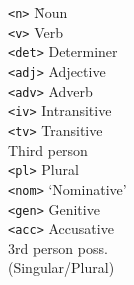 \documentclass[a0paper,fontscale=0.3]{baposter}  %
\begin{document}
\begin{poster}
{\vspace{-1.5em}
\setlength{\columnsep}{-1em}
\setlength{\topsep}{-\parskip}
\begin{multicols}{3}
\begin{tabbing}
  \texttt{{\small <n>}}\hspace{3.1em} \=  Noun\\[-0.5ex]
  \texttt{{\small <v>}} \>  Verb\\[-0.5ex]
  \texttt{{\small <det>}} \>  Determiner\\[-0.5ex]
  \texttt{{\small <adj>}} \> Adjective\\[-0.5ex]
  \texttt{{\small <adv>}} \> Adverb\\[-0.5ex]
  \texttt{{\small <iv>}} \> Intransitive\\[-0.5ex]
  \texttt{{\small <tv>}} \> Transitive\\[-0.5ex]
  \texttt{{}} \> Third person\\[-0.5ex]
  \texttt{{\small <pl>}} \> Plural\\[-0.5ex]
  \texttt{{\small <nom>}} \> `Nominative'\\[-0.5ex]
  \texttt{{\small <gen>}} \> Genitive\\[-0.5ex]
  \texttt{{\small <acc>}} \> Accusative\\[-0.5ex]
  \texttt{{}} \> 3rd person poss.\\[-0.5ex]
  	\> \hspace{2em}(Singular/Plural)\\[-0.5ex]

\end{tabbing}
\end{multicols}}
\end{poster}
\end{document}
